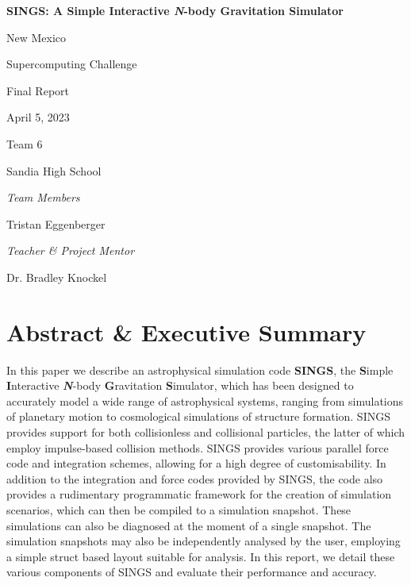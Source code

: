 \documentclass[12pt, twoside, letterpaper]{article}
\begin{document}
\pagestyle{fancy}
\fancyhf{}
\renewcommand{\headrulewidth}{0pt}
\setlength{\headheight}{15pt}
\captionsetup[subfigure]{width=.9\textwidth}
\raggedbottom

\nocite{*}

\begin{titlepage}
\begin{center}
\vspace{2cm}

\Large
\textbf{SINGS: A Simple Interactive \textit{N}-body Gravitation Simulator}

\vspace{0.5cm}
New Mexico

Supercomputing Challenge

Final Report

April 5, 2023

\vspace{0.5cm}
Team 6

Sandia High School

\end{center}
\vspace{1cm}
\begin{flushleft}	
\end{flushleft}
\Large
\textit{Team Members}

Tristan Eggenberger

\noindent \textit{Teacher \& Project Mentor}

Dr. Bradley Knockel
\end{titlepage}

\renewcommand*\contentsname{Table of Contents}
\tableofcontents

\pagebreak

\section*{Abstract \& Executive Summary} \label{sec:abstract}

In this paper we describe an astrophysical simulation code \textbf{SINGS}, the \textbf{S}imple \textbf{I}nteractive \textbf{\textit{N}}-body \textbf{G}ravitation \textbf{S}imulator, which has been designed to accurately model a wide range of astrophysical systems, ranging from simulations of planetary motion to cosmological simulations of structure formation. SINGS provides support for both collisionless and collisional particles, the latter of which employ impulse-based collision methods. SINGS provides various parallel force code and integration schemes, allowing for a high degree of customisability. In addition to the integration and force codes provided by SINGS, the code also provides a rudimentary programmatic framework for the creation of simulation scenarios, which can then be compiled to a simulation snapshot. These simulations can also be diagnosed at the moment of a single snapshot. The simulation snapshots may also be independently analysed by the user, employing a simple struct based layout suitable for analysis. In this report, we detail these various components of SINGS and evaluate their performance and accuracy.
\end{document}
